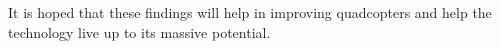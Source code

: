 
It is hoped that these findings will help in improving quadcopters and help the technology live up to its massive potential. 
